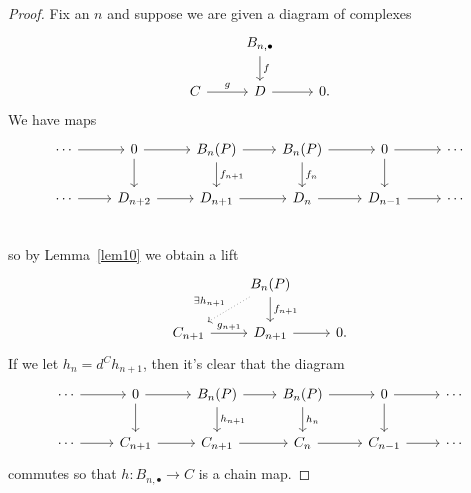 \documentclass[10pt]{amsart}
\begin{document}
\begin{ex}
\begin{proof}
    Fix an $n$ and suppose we are given a diagram of complexes
    $$\begin{tikzcd}
      & B_{n,\bullet}\arrow{d}{f} &\\
      C\arrow{r}{g} & D\arrow{r} & 0.
    \end{tikzcd}$$
    We have maps
    $$\begin{tikzcd}
      \cdots \arrow{r} & 0 \arrow{d} \arrow{r} & B_n(P) \arrow{d}{f_{n+1}} \arrow{r} & B_n(P) \arrow{d}{f_n} \arrow{r} & 0 \arrow{d} \arrow{r} & \cdots\\
      \cdots \arrow{r} & D_{n+2} \arrow{r} & D_{n+1} \arrow{r} & D_n \arrow{r} & D_{n-1} \arrow{r} & \cdots\\
    \end{tikzcd}$$
    so by Lemma~\ref{lem10} we obtain a lift
    $$\begin{tikzcd}
      & B_n(P) \arrow[dotted,swap]{dl}{\exists h_{n+1}}\arrow{d}{f_{n+1}} &\\
      C_{n+1} \arrow{r}{g_{n+1}} & D_{n+1} \arrow{r} & 0.
    \end{tikzcd}$$
    If we let $h_n = d^C h_{n+1}$, then it's clear that the diagram
    $$\begin{tikzcd}
      \cdots \arrow{r} & 0 \arrow{d} \arrow{r} & B_n(P) \arrow{r} \arrow{d}{h_{n+1}}& B_n(P) \arrow{d}{h_n} \arrow{r} & 0 \arrow{r}\arrow{d} & \cdots\\
      \cdots \arrow{r} & C_{n+1} \arrow{r} & C_{n+1} \arrow{r} & C_n \arrow{r} & C_{n-1} \arrow{r} & \cdots
    \end{tikzcd}$$
    commutes so that $h : B_{n,\bullet} \rightarrow C$ is a chain map.


\end{proof}
\end{ex}
\end{document}
